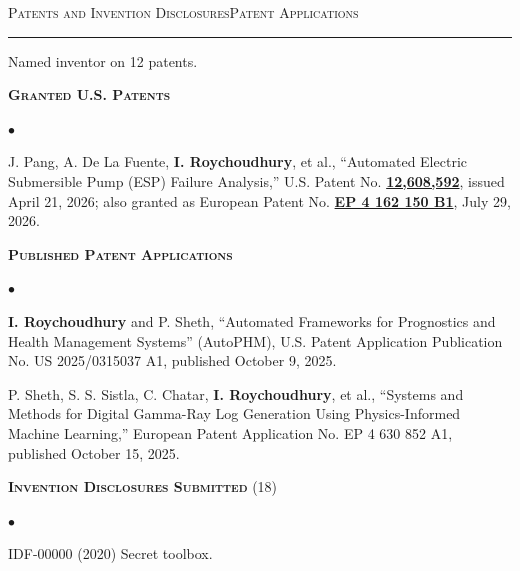 \textsc{\Large{Patents and \ifinternalcv Invention Disclosures\else Patent Applications\fi}}
\vspace{3pt}
\hrule
\vspace{3pt}

Named inventor on 12 patents.

\begin{list}{}{\leftmargin=0in}

\item \textsc{\textbf{Granted U.S. Patents}}

\begin{list}{$\bullet$}{ \topsep -0.1in \itemsep -0.01in}
\item J. Pang, A. De La Fuente, \textbf{I. Roychoudhury}, et al., ``Automated Electric Submersible Pump (ESP) Failure Analysis,'' U.S. Patent No. \href{https://patents.google.com/patent/US12608592B2/en}{\textbf{12,608,592}}, issued April 21, 2026; also granted as European Patent No. \href{https://patents.google.com/patent/EP4162150B1/en}{\textbf{EP 4 162 150 B1}}, July 29, 2026.
\end{list}

\item \textsc{\textbf{Published Patent Applications}}

\begin{list}{$\bullet$}{ \topsep -0.1in \itemsep -0.01in}
\item \textbf{I. Roychoudhury} and P. Sheth, ``Automated Frameworks for Prognostics and Health Management Systems'' (AutoPHM), U.S. Patent Application Publication No. US 2025/0315037 A1, published October 9, 2025.
\item P. Sheth, S. S. Sistla, C. Chatar, \textbf{I. Roychoudhury}, et al., ``Systems and Methods for Digital Gamma-Ray Log Generation Using Physics-Informed Machine Learning,'' European Patent Application No. EP 4 630 852 A1, published October 15, 2025.
\end{list}

\begin{internalblock}
\item \textsc{\textbf{Invention Disclosures Submitted}} (18)
\begin{list}{$\bullet$}{}
\item IDF-00000 (2020) Secret toolbox.
\end{list}
\end{internalblock}

\end{list}
